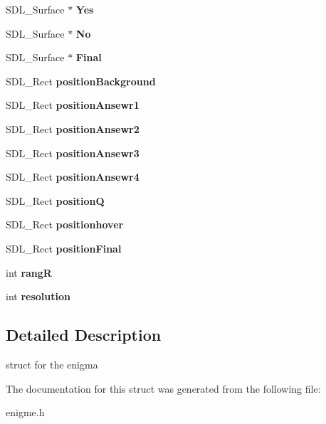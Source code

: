 \begin{DoxyCompactItemize}
S\+D\+L\+\_\+\+Surface $\ast$ {\bfseries Yes}
\item 
\mbox{\label{structenigme_a630ac6f3949179ec340c9e71ad53faee}} 
S\+D\+L\+\_\+\+Surface $\ast$ {\bfseries No}
\item 
\mbox{\label{structenigme_a38e749d7ae027b8a4b487a49b49fe671}} 
S\+D\+L\+\_\+\+Surface $\ast$ {\bfseries Final}
\item 
\mbox{\label{structenigme_ae0dd357e0952647ab0de64abc803b660}} 
S\+D\+L\+\_\+\+Rect {\bfseries position\+Background}
\item 
\mbox{\label{structenigme_abd09b99260062e8b2f5ec41c9eedbfae}} 
S\+D\+L\+\_\+\+Rect {\bfseries position\+Ansewr1}
\item 
\mbox{\label{structenigme_a64fefb6cab2baaee1c0e54d51f4b5486}} 
S\+D\+L\+\_\+\+Rect {\bfseries position\+Ansewr2}
\item 
\mbox{\label{structenigme_aba195f6df5f2e975e2bb19983f2ae542}} 
S\+D\+L\+\_\+\+Rect {\bfseries position\+Ansewr3}
\item 
\mbox{\label{structenigme_a5b5c3043e61541f4c63c1bc55651ca51}} 
S\+D\+L\+\_\+\+Rect {\bfseries position\+Ansewr4}
\item 
\mbox{\label{structenigme_ae10e2d3b647b0728eba96dcbc3098619}} 
S\+D\+L\+\_\+\+Rect {\bfseries positionQ}
\item 
\mbox{\label{structenigme_acbf34a299f6a43366abb738df85c282d}} 
S\+D\+L\+\_\+\+Rect {\bfseries positionhover}
\item 
\mbox{\label{structenigme_a53787af725dae2956717fa2eba7ca6a9}} 
S\+D\+L\+\_\+\+Rect {\bfseries position\+Final}
\item 
\mbox{\label{structenigme_af7467a612a16fb5cdd6707dd80e52269}} 
int {\bfseries rangR}
\item 
\mbox{\label{structenigme_aecd303e40283cd9e1480aa937104266a}} 
int {\bfseries resolution}
\end{DoxyCompactItemize}


\subsection{Detailed Description}
struct for the enigma 

The documentation for this struct was generated from the following file\+:\begin{DoxyCompactItemize}
\item 
enigme.\+h\end{DoxyCompactItemize}
